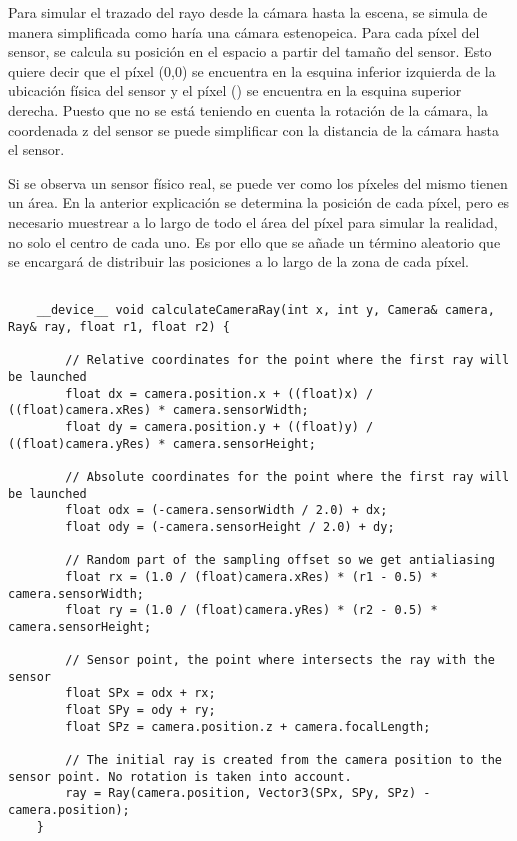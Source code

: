 Para simular el trazado del rayo desde la cámara hasta la escena, se simula de manera simplificada como haría una cámara estenopeica. Para cada píxel del sensor, se calcula su posición en el espacio a partir del tamaño del sensor. Esto quiere decir que el píxel (0,0) se encuentra en la esquina inferior izquierda de la ubicación física del sensor y el píxel () se encuentra en la esquina superior derecha. Puesto que no se está teniendo en cuenta la rotación de la cámara, la coordenada z del sensor se puede simplificar con la distancia de la cámara hasta el sensor.

Si se observa un sensor físico real, se puede ver como los píxeles del mismo tienen un área. En la anterior explicación se determina la posición de cada píxel, pero es necesario muestrear a lo largo de todo el área del píxel para simular la realidad, no solo el centro de cada uno. Es por ello que se añade un término aleatorio  que se encargará de distribuir las posiciones a lo largo de la zona de cada píxel.

\begin{minipage}[c]{0.95\textwidth}
\begin{lstlisting}[label={cod:cameraray}, caption={Trazado de rayo a cámara}]
	
	__device__ void calculateCameraRay(int x, int y, Camera& camera, Ray& ray, float r1, float r2) {

		// Relative coordinates for the point where the first ray will be launched
		float dx = camera.position.x + ((float)x) / ((float)camera.xRes) * camera.sensorWidth;
		float dy = camera.position.y + ((float)y) / ((float)camera.yRes) * camera.sensorHeight;

		// Absolute coordinates for the point where the first ray will be launched
		float odx = (-camera.sensorWidth / 2.0) + dx;
		float ody = (-camera.sensorHeight / 2.0) + dy;

		// Random part of the sampling offset so we get antialiasing
		float rx = (1.0 / (float)camera.xRes) * (r1 - 0.5) * camera.sensorWidth;
		float ry = (1.0 / (float)camera.yRes) * (r2 - 0.5) * camera.sensorHeight;

		// Sensor point, the point where intersects the ray with the sensor
		float SPx = odx + rx;
		float SPy = ody + ry;
		float SPz = camera.position.z + camera.focalLength;

		// The initial ray is created from the camera position to the sensor point. No rotation is taken into account.
		ray = Ray(camera.position, Vector3(SPx, SPy, SPz) - camera.position);
	}

\end{lstlisting}
\end{minipage}
	
